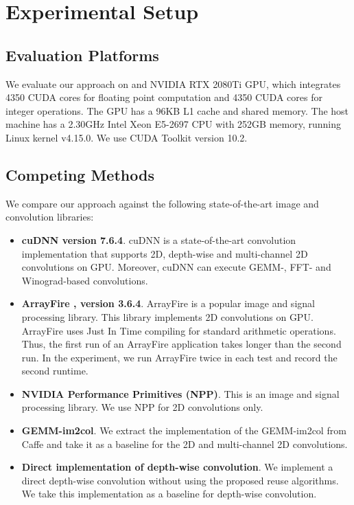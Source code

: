 

\section{Experimental Setup}

\subsection{Evaluation Platforms} We evaluate our approach on and NVIDIA RTX 2080Ti GPU, which integrates 4350 CUDA cores for floating
point computation  and 4350 CUDA cores for integer operations. The GPU has a 96KB L1 cache and shared memory. The host machine has a 2.30GHz
Intel Xeon E5-2697 CPU with 252GB memory, running Linux kernel v4.15.0. We use CUDA Toolkit version 10.2.


\subsection{Competing Methods} We compare our approach against the following state-of-the-art image and convolution libraries:
\begin{itemize}
  \item \textbf{cuDNN version 7.6.4}. cuDNN is a state-of-the-art convolution implementation that supports 2D, depth-wise and multi-channel 2D convolutions
      on GPU. Moreover, cuDNN can execute GEMM-, FFT- and Winograd-based convolutions.
  \item \textbf{ArrayFire \cite{Yalamanchili2015}, version 3.6.4}. ArrayFire is a popular image and signal processing library. This
      library implements 2D convolutions on GPU. ArrayFire uses Just In Time compiling for standard arithmetic operations. Thus, the
      first run of an ArrayFire application takes longer than the second run. In the experiment, we run ArrayFire twice in each test and
      record the second runtime.
  \item \textbf{NVIDIA Performance Primitives (NPP)}. This is an image and signal processing library. We use NPP for 2D convolutions
      only.
  \item \textbf{GEMM-im2col}. We extract the implementation of the GEMM-im2col from Caffe \cite{jia2014caffe} and take it as a baseline
      for the 2D and multi-channel 2D convolutions.
  \item \textbf{Direct implementation of depth-wise convolution}. We implement a direct depth-wise convolution without using the proposed reuse algorithms. We take this implementation as a baseline for depth-wise convolution.

\end{itemize}

